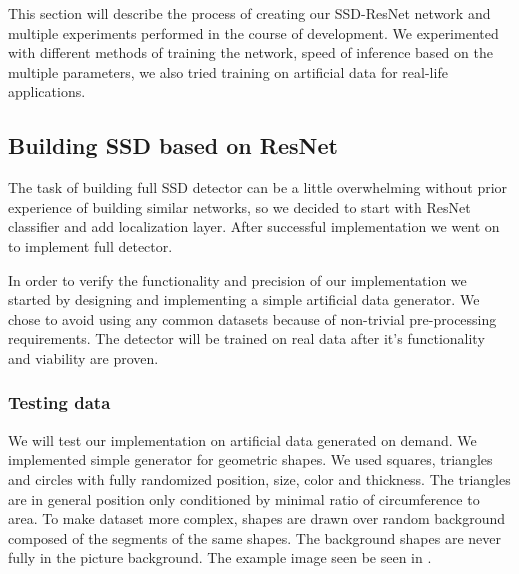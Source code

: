 This section will describe the process of creating our SSD-ResNet network and multiple experiments performed in the course of development. We experimented with different methods of training the network, speed of inference based on the multiple parameters, we also tried training on artificial data for real-life applications.


\subsection{Building SSD based on ResNet}
The task of building full SSD detector can be a little overwhelming without prior experience of building similar networks, so we decided to start with ResNet classifier and add localization layer. After successful implementation we went on to implement full detector. 

In order to verify the functionality and precision of our implementation we started by designing and implementing a simple artificial data generator. We chose to avoid using any common datasets because of non-trivial pre-processing requirements. The detector will be trained on real data after it's functionality and viability are proven.

\subsubsection{Testing data}
We will test our implementation on artificial data generated on demand. We implemented simple generator for geometric shapes. We used squares, triangles and circles with fully randomized position, size, color and thickness. The triangles are in general position only conditioned by minimal ratio of circumference to area.
To make dataset more complex, shapes are drawn over random background composed of the segments of the same shapes. The background shapes are never fully in the picture background. The example image seen be seen in .






